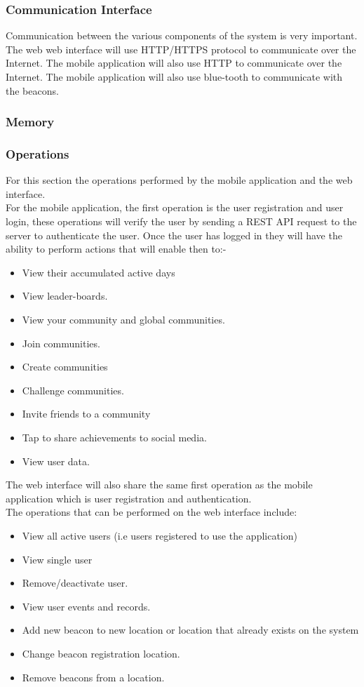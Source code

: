 \documentclass[11pt]{article}
\begin{document}
\subsubsection{Communication Interface}
Communication between the various components of the system is very important. The web web interface will use HTTP/HTTPS protocol to communicate over the Internet. The mobile application will also use HTTP to communicate over the Internet. The mobile  application will also use blue-tooth to communicate with the beacons.
\subsubsection{Memory}

\subsubsection{Operations}
For this section the operations performed by the mobile application and the web interface. \\
For the mobile application, the first operation is the user registration and user login, these operations will verify the user by sending a REST API request to the server to authenticate the user.
Once the user has logged in they will have the ability to perform actions that will enable then to:-
\begin{itemize}
	\item View their accumulated active days
	\item View leader-boards.
	\item View your community and global communities. 
	\item Join communities.
	\item Create communities
	\item Challenge communities.
	\item Invite friends to a community
	\item Tap to share achievements to social media.
	\item View user data.
\end{itemize}
The web interface will also share the same first operation as the mobile application which is user registration and authentication.\\
The operations that can be performed on the web interface include:
\begin{itemize}
	\item View all active users (i.e users registered to use the application)
	\item View single user
	\item Remove/deactivate user.
	\item View user events and records.
	\item Add new beacon to new location or location that already exists on the system
	\item Change beacon registration location.
	\item Remove beacons from a location.
\end{itemize}
\end{document}
